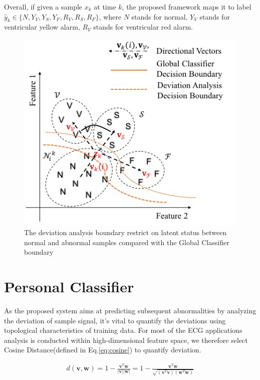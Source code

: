 Overall, if given a sample $x_k$ at time $k$, the proposed framework maps it to label $\hat{y}_k \in \{N,Y_V,Y_S,Y_F,R_V,R_S,R_F\}$, where $N$ stands for normal, $Y_V$ stands for ventricular yellow alarm, $R_V$ stands for ventricular red alarm.

\begin{figure}[t]
\centering
\includegraphics[scale=.7]{Fig/topology.jpg}
\caption{The deviation analysis boundary restrict on latent status between normal and abnormal samples compared with the Global Classifier boundary}
\label{fig:topo_deviation}
\end{figure}


\section{Personal Classifier}

As the proposed system aims at predicting subsequent abnormalities by analyzing the deviation of sample signal, it's vital to quantify the deviations using topological characteristics of training data. For most of the ECG applications analysis is conducted within high-dimensional feature space, we therefore select Cosine Distance(defined in Eq.\ref{eq:cosine}) to quantify deviation.

\begin{align}
\label{eq:cosine}
d(\mathbf{v},\mathbf{w})= 1 - \frac{\mathbf{v}^T\mathbf{w}}{|\mathbf{v}||\mathbf{w}|}=1 - \frac{\mathbf{v}^T\mathbf{w}}{\sqrt{(\mathbf{v}^T\mathbf{v})(\mathbf{w}^T\mathbf{w})}}
\end{align}


